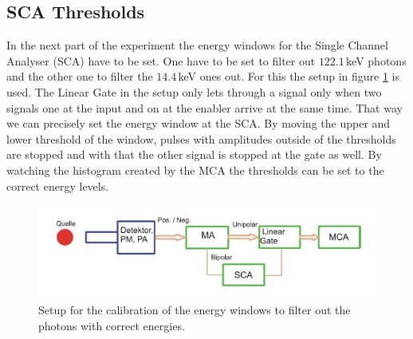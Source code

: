 \documentclass[30pt,a4paper]{article}
\begin{document}
 	\subsection{SCA Thresholds}
 	In the next part of the experiment the energy windows for the Single Channel Analyser (SCA) have to be set. One have to be set to filter out $122.1$\,keV photons and the other one to filter the $14.4$\,keV ones out. For this the setup in figure \ref{setup_EW} is used. The Linear Gate in the setup only lets through a signal only when two signals one at the input and on at the enabler arrive at the same time. That way we can precisely set the energy window at the SCA. By moving the upper and lower threshold of the window, pulses with amplitudes outside of the thresholds are stopped and with that the other signal is stopped at the gate as well. By watching the histogram created by the MCA the thresholds can be set to the correct energy levels. \cite{Anleitung}
 	\begin{figure}[h]
 		\includegraphics{Bilder/Circuit_ES_calib}
 		\centering
 		\caption{\small Setup for the calibration of the energy windows to filter out the photons with correct energies. \cite{Anleitung}}
 		\label{setup_EW}
 	\end{figure}\\
 	\FloatBarrier
\end{document}
